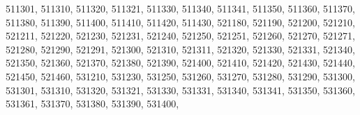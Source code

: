 \textquotesingle{}511301\textquotesingle{}, \textquotesingle{}511310\textquotesingle{}, \textquotesingle{}511320\textquotesingle{}, \textquotesingle{}511321\textquotesingle{}, \textquotesingle{}511330\textquotesingle{}, \textquotesingle{}511340\textquotesingle{}, \textquotesingle{}511341\textquotesingle{}, \textquotesingle{}511350\textquotesingle{}, \textquotesingle{}511360\textquotesingle{}, \textquotesingle{}511370\textquotesingle{}, \textquotesingle{}511380\textquotesingle{}, \textquotesingle{}511390\textquotesingle{}, \textquotesingle{}511400\textquotesingle{}, \textquotesingle{}511410\textquotesingle{}, \textquotesingle{}511420\textquotesingle{}, \textquotesingle{}511430\textquotesingle{}, \textquotesingle{}521180\textquotesingle{}, \textquotesingle{}521190\textquotesingle{}, \textquotesingle{}521200\textquotesingle{}, \textquotesingle{}521210\textquotesingle{}, \textquotesingle{}521211\textquotesingle{}, \textquotesingle{}521220\textquotesingle{}, \textquotesingle{}521230\textquotesingle{}, \textquotesingle{}521231\textquotesingle{}, \textquotesingle{}521240\textquotesingle{}, \textquotesingle{}521250\textquotesingle{}, \textquotesingle{}521251\textquotesingle{}, \textquotesingle{}521260\textquotesingle{}, \textquotesingle{}521270\textquotesingle{}, \textquotesingle{}521271\textquotesingle{}, \textquotesingle{}521280\textquotesingle{}, \textquotesingle{}521290\textquotesingle{}, \textquotesingle{}521291\textquotesingle{}, \textquotesingle{}521300\textquotesingle{}, \textquotesingle{}521310\textquotesingle{}, \textquotesingle{}521311\textquotesingle{}, \textquotesingle{}521320\textquotesingle{}, \textquotesingle{}521330\textquotesingle{}, \textquotesingle{}521331\textquotesingle{}, \textquotesingle{}521340\textquotesingle{}, \textquotesingle{}521350\textquotesingle{}, \textquotesingle{}521360\textquotesingle{}, \textquotesingle{}521370\textquotesingle{}, \textquotesingle{}521380\textquotesingle{}, \textquotesingle{}521390\textquotesingle{}, \textquotesingle{}521400\textquotesingle{}, \textquotesingle{}521410\textquotesingle{}, \textquotesingle{}521420\textquotesingle{}, \textquotesingle{}521430\textquotesingle{}, \textquotesingle{}521440\textquotesingle{}, \textquotesingle{}521450\textquotesingle{}, \textquotesingle{}521460\textquotesingle{}, \textquotesingle{}531210\textquotesingle{}, \textquotesingle{}531230\textquotesingle{}, \textquotesingle{}531250\textquotesingle{}, \textquotesingle{}531260\textquotesingle{}, \textquotesingle{}531270\textquotesingle{}, \textquotesingle{}531280\textquotesingle{}, \textquotesingle{}531290\textquotesingle{}, \textquotesingle{}531300\textquotesingle{}, \textquotesingle{}531301\textquotesingle{}, \textquotesingle{}531310\textquotesingle{}, \textquotesingle{}531320\textquotesingle{}, \textquotesingle{}531321\textquotesingle{}, \textquotesingle{}531330\textquotesingle{}, \textquotesingle{}531331\textquotesingle{}, \textquotesingle{}531340\textquotesingle{}, \textquotesingle{}531341\textquotesingle{}, \textquotesingle{}531350\textquotesingle{}, \textquotesingle{}531360\textquotesingle{}, \textquotesingle{}531361\textquotesingle{}, \textquotesingle{}531370\textquotesingle{}, \textquotesingle{}531380\textquotesingle{}, \textquotesingle{}531390\textquotesingle{}, \textquotesingle{}531400\textquotesingle{}, 